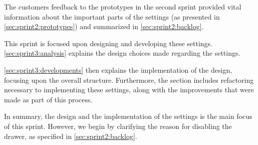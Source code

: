 The customers feedback to the prototypes in the second sprint provided vital information about the important parts of the settings (as presented in \cref{sec:sprint2:prototypes}) and summarized in \cref{sec:sprint2:backlog}.

This sprint is focused upon designing and developing these settings.
\cref{sec:sprint3:analysis} explains the design choices made regarding the settings.

\cref{sec:sprint3:developments} then explains the implementation of the design, focusing upon the overall structure.
Furthermore, the section includes refactoring necessary to implementing these settings, along with the improvements that were made as part of this process.

In summary, the design and the implementation of the settings is the main focus of this sprint.
However, we begin by clarifying the reason for disabling the drawer, as specified in \cref{sec:sprint2:backlog}.